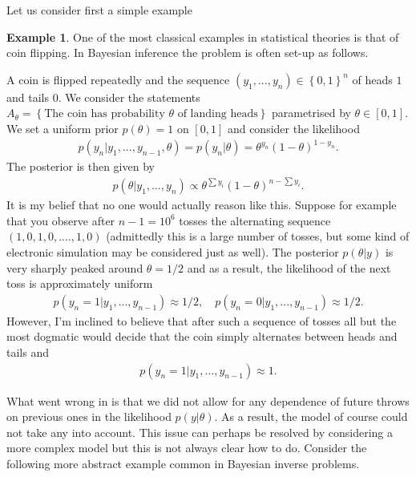 \documentclass[
    a4paper,
    DIV=14,
    abstract=true,
    numbers=noenddot
]
{scrartcl}
\theoremstyle{definition}
\newtheorem{example}[theorem]{Example}
\newcommand{\set}[1]{\left\{#1\right\}}
\begin{document}
Let us consider first a simple example
\begin{example}\label{coin}
    One of the most classical examples in statistical theories is that of coin flipping. In Bayesian inference the problem is often set-up as follows.

    A coin is flipped repeatedly and the sequence $(y_1,...,y_n) \in \set{0,1}^n$  of heads $1$  and tails $0$. We consider the statements $A_\theta = \set{\text{The coin has probability $\theta $ of landing heads}}$ parametrised by $\theta \in [0,1]$. We set a uniform prior $p(\theta )=1$ on $[0,1]$ and consider the likelihood
    \begin{align*}
        p(y_n|y_1,...,y_{n-1},\theta )= p(y_n|\theta )= \theta ^{y_n}(1-\theta )^{1-y_n}.
    \end{align*}
    The posterior is then given by
    \begin{align*}
        p(\theta |y_1,...,y_n) \propto \theta ^{\sum y_i}(1-\theta )^{n-\sum y_i}.
    \end{align*}
    It is my belief that no one would actually reason like this. Suppose for example that you observe after $n-1=10^6$ tosses the alternating sequence $(1,0,1,0,....,1,0)$  (admittedly this is a large number of tosses, but some kind of electronic simulation may be considered just as well). The posterior $p(\theta |y)$ is very sharply peaked around $\theta =1/2$ and as a result, the likelihood of the next toss is approximately uniform
    \begin{align*}
        p(y_{n}=1|y_1,...,y_{n-1})\approx 1/2, \quad p(y_{n}=0|y_1,...,y_{n-1})\approx 1/2.
    \end{align*}
    However, I'm inclined to believe that after such a sequence of tosses all but the most dogmatic would decide that the coin simply alternates between heads and tails and
    \begin{align*}
        p(y_n=1|y_1,...,y_{n-1})\approx 1.
    \end{align*}
\end{example}
What went wrong in  is that we did not allow for any dependence of future throws on previous ones in the likelihood $p(y|\theta )$. As a result, the model of course could not take any into account. This issue can perhaps be resolved by considering a more complex model but this is not always clear how to do. Consider the following more abstract example common in Bayesian inverse problems.
\end{document}

